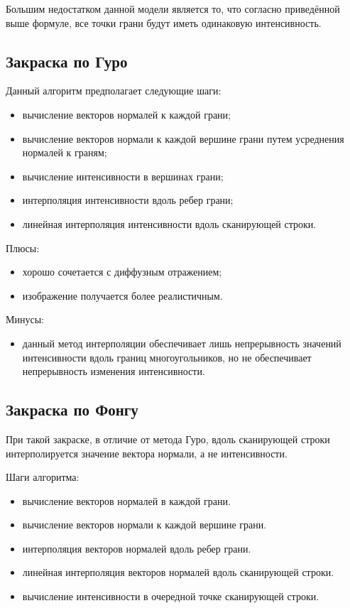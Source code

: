 Большим недостатком данной модели является то, что согласно приведённой выше формуле, все точки грани будут иметь одинаковую интенсивность.

\subsection{Закраска по Гуро}

Данный алгоритм предполагает следующие шаги:

\begin{itemize}
	\item вычисление векторов нормалей к каждой грани;
    \item вычисление векторов нормали к каждой вершине грани путем усреднения нормалей к граням;
    \item вычисление интенсивности в вершинах грани;
    \item интерполяция интенсивности вдоль ребер грани;
    \item линейная интерполяция интенсивности вдоль сканирующей строки.
\end{itemize}

Плюсы:

\begin{itemize}
	\item хорошо сочетается с диффузным отражением;
	\item изображение получается более реалистичным.
\end{itemize}

Минусы:

\begin{itemize}
	\item данный метод интерполяции обеспечивает лишь непрерывность значений интенсивности вдоль границ многоугольников, но не обеспечивает непрерывность изменения интенсивности.
\end{itemize}


\subsection{Закраска по Фонгу}

При такой закраске, в отличие от метода Гуро, вдоль сканирующей строки интерполируется значение вектора нормали, а не интенсивности. 

Шаги алгоритма:

\begin{itemize}
    \item вычисление векторов нормалей в каждой грани.
    \item вычисление векторов нормали к каждой вершине грани.
    \item интерполяция векторов нормалей вдоль ребер грани.
    \item линейная интерполяция векторов нормалей вдоль сканирующей строки.
    \item вычисление интенсивности в очередной точке сканирующей строки.
\end{itemize}

